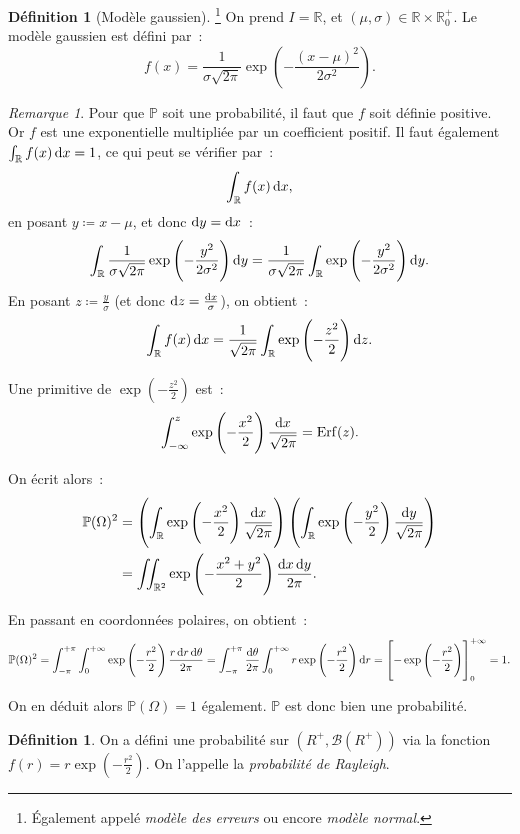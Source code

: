 \documentclass{article}
\renewcommand{\P}{\mathbb P}
\newcommand{\R}{\mathbb R}
\DeclareMathOperator{\Erf}{Erf}
\theoremstyle{definition}
\newtheorem{déf}[thm]{Définition}
\theoremstyle{remark}
\newtheorem*{rmq}{Remarque}
\begin{document}
		\begin{déf}[Modèle gaussien]\footnote{Également appelé \emph{modèle des erreurs} ou encore \textit{modèle normal}.} On prend $I = \R$, et
		$(\mu, \sigma) \in \R \times \R^+_0$. Le modèle gaussien est défini par~:
		\[f(x) = \frac 1{\sigma\sqrt{2\pi}}\exp\left(-\frac {(x-\mu)^2}{2\sigma^2}\right).\]
		\end{déf}

		\begin{rmq} Pour que $\P$ soit une probabilité, il faut que $f$ soit définie positive. Or $f$ est une exponentielle multipliée par un coefficient
		positif. Il faut également $\int_\R f(x)\dif x = 1$, ce qui peut se vérifier par~:
		\[\int_\R f(x)\dif x,\]
		en posant $y \coloneqq x-\mu$, et donc $\dif y = \dif x$~:
		\[\int_\R \frac 1{\sigma \sqrt{2\pi}}\exp\left(-\frac {y^2}{2\sigma^2}\right)\dif y
			= \frac 1{\sigma\sqrt{2\pi}}\int_\R\exp\left(-\frac {y^2}{2\sigma^2}\right)\dif y.\]
		En posant $z \coloneqq \frac y\sigma$ (et donc $\dif z = \frac {\dif x}\sigma$), on obtient~:
		\[\int_\R f(x)\dif x = \frac 1{\sqrt{2\pi}}\int_\R\exp\left(-\frac {z^2}2\right)\dif z.\]

		Une primitive de $\exp\left(-\frac {z^2}2\right)$ est~:
		\[\int_{-\infty}^z\exp\left(-\frac {x^2}2\right)\frac {\dif x}{\sqrt{2\pi}} = \Erf(z).\]

		On écrit alors~:
		\[\begin{aligned}
			\P(\Omega)^2 &= \left(\int_\R\exp\left(-\frac {x^2}2\right)\frac {\dif x}{\sqrt{2\pi}}\right)
			                \left(\int_\R\exp\left(-\frac {y^2}2\right)\frac {\dif y}{\sqrt{2\pi}}\right) \\
			             &= \iint_{\R^2}\exp\left(-\frac {x^2+y^2}2\right)\frac {\dif x\dif y}{2\pi}.
		\end{aligned}\]
		
		En passant en coordonnées polaires, on obtient~:
		\[\P(\Omega)^2 = \int_{-\pi}^{+\pi}\int_0^{+\infty}\exp\left(-\frac {r^2}2\right)\frac {r\dif r\dif \theta}{2\pi}
		= \int_{-\pi}^{+\pi}\frac {\dif \theta}{2\pi}\int_0^{+\infty} r\exp\left(-\frac {r^2}2\right)\dif r
		= \left[-\exp\left(-\frac {r^2}2\right)\right]_0^{+\infty} = 1.\]

		On en déduit alors $\P(\Omega) = 1$ également. $\P$ est donc bien une probabilité. \end{rmq}
		
		\begin{déf} On a défini une probabilité sur $\left(R^+, \mathcal B(R^+)\right)$ via la fonction $f(r) = r\exp\left(-\frac {r^2}2\right)$.
		On l'appelle la \emph{probabilité de Rayleigh}. \end{déf}
\end{document}
